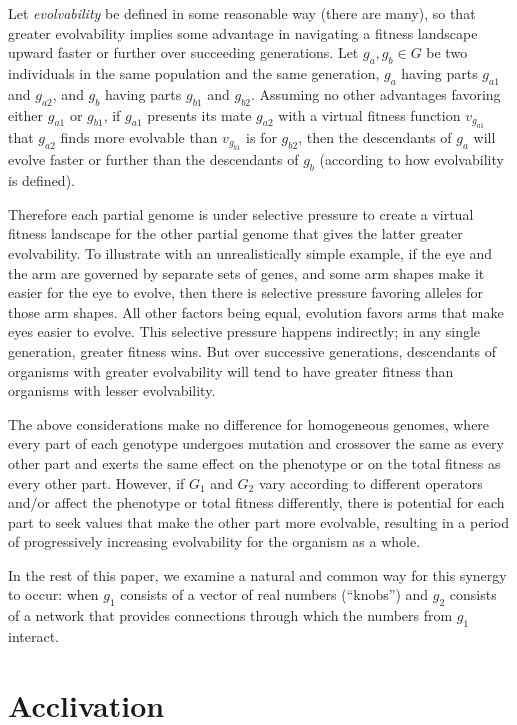 \documentclass[letterpaper]{article}
\begin{document}
Let \textit{evolvability} be defined in some reasonable way (there are many),
so that greater evolvability implies some advantage in navigating a fitness
landscape upward faster or further over succeeding generations. Let $g_a,g_b
\in G$ be two individuals in the same population and the same generation,
$g_a$ having parts $g_{a1}$ and $g_{a2}$, and $g_b$ having parts $g_{b1}$ and
$g_{b2}$.  Assuming no other advantages favoring either $g_{a1}$ or $g_{b1}$,
if $g_{a1}$ presents its mate $g_{a2}$ with a virtual fitness function
$v_{g_{a1}}$ that $g_{a2}$ finds more evolvable than $v_{g_{b1}}$ is for
$g_{b2}$, then the descendants of $g_a$ will evolve faster or further than the
descendants of $g_b$ (according to how evolvability is defined).

Therefore each partial genome is under selective pressure to create a virtual
fitness landscape for the other partial genome that gives the latter greater
evolvability. To illustrate with an unrealistically simple example, if the eye
and the arm are governed by separate sets of genes, and some arm shapes make
it easier for the eye to evolve, then there is selective pressure favoring
alleles for those arm shapes. All other factors being equal, evolution favors
arms that make eyes easier to evolve. This selective pressure happens
indirectly; in any single generation, greater fitness wins. But over successive
generations, descendants of organisms with greater evolvability will tend to
have greater fitness than organisms with lesser evolvability.

The above considerations make no difference for homogeneous genomes, where
every part of each genotype undergoes mutation and crossover the same as every
other part and exerts the same effect on the phenotype or on the total fitness
as every other part. However, if $G_1$ and $G_2$ vary according to different
operators and/or affect the phenotype or total fitness differently, there is
potential for each part to seek values that make the other part more
evolvable, resulting in a period of progressively increasing evolvability for
the organism as a whole.

In the rest of this paper, we examine a natural and common way for this
synergy to occur: when $g_1$ consists of a vector of real numbers (``knobs'')
and $g_2$ consists of a network that provides connections through which the
numbers from $g_1$ interact.

\section{Acclivation}
\end{document}
